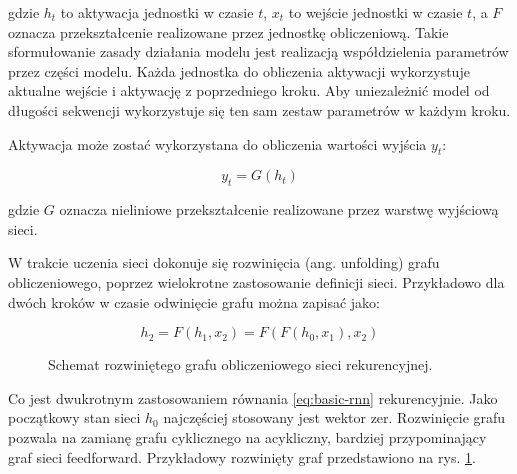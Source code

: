 \documentclass[oneside, mag]{mgr}
\begin{document}
gdzie $h_t$ to aktywacja jednostki w czasie $t$, $x_t$ to wejście jednostki w czasie $t$, a $F$ oznacza przekształcenie realizowane przez jednostkę obliczeniową. Takie sformułowanie zasady działania modelu jest realizacją współdzielenia parametrów przez części modelu. Każda jednostka do obliczenia aktywacji wykorzystuje aktualne wejście i aktywację z poprzedniego kroku. Aby uniezależnić model od długości sekwencji wykorzystuje się ten sam zestaw parametrów w każdym kroku.

Aktywacja może zostać wykorzystana do obliczenia wartości wyjścia $y_t$:

\begin{equation}
	y_t = G(h_t)
\end{equation}

gdzie $G$ oznacza nieliniowe przekształcenie realizowane przez warstwę wyjściową sieci.

W trakcie uczenia sieci dokonuje się rozwinięcia (ang. unfolding) grafu obliczeniowego, poprzez wielokrotne zastosowanie definicji sieci. Przykładowo dla dwóch kroków w czasie odwinięcie grafu można zapisać jako:

\begin{equation}
	h_2 = F(h_1, x_2) = F(F(h_0, x_1), x_2)
\end{equation}

\begin{figure}[h]
\centering
{}
\caption{Schemat rozwiniętego grafu obliczeniowego sieci rekurencyjnej.}
\label{fig:unfolded}
\end{figure}

Co jest dwukrotnym zastosowaniem równania \ref{eq:basic-rnn} rekurencyjnie. Jako początkowy stan sieci $h_0$ najczęściej stosowany jest wektor zer. Rozwinięcie grafu pozwala na zamianę grafu cyklicznego na acykliczny, bardziej przypominający graf sieci feedforward. Przykładowy rozwinięty graf przedstawiono na rys. \ref{fig:unfolded}.
\end{document}
